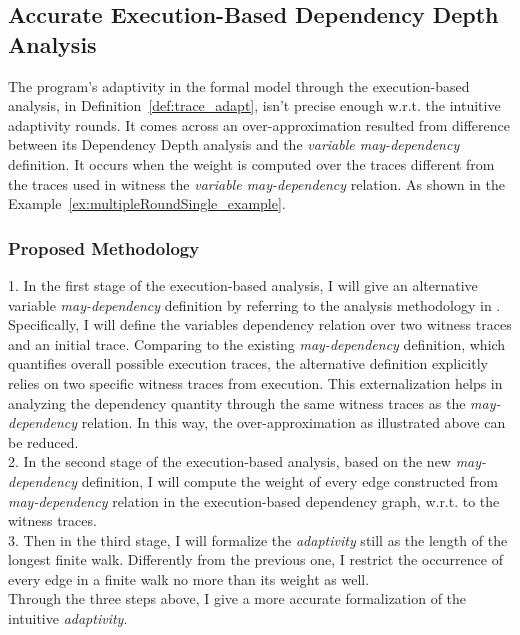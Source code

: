 \subsection{Accurate Execution-Based Dependency Depth Analysis}
\label{subsec:furthers-dep-depth}
%
The program's adaptivity in the formal model through the execution-based analysis,
in Definition~\ref{def:trace_adapt}, isn't precise enough w.r.t. the intuitive adaptivity rounds.
It comes across an over-approximation 
resulted from difference between its Dependency Depth analysis and the \emph{variable may-dependency} definition.
It occurs when the weight is computed over the traces different from the traces used in 
witness the \emph{variable may-dependency} relation.
As shown in the Example~\ref{ex:multipleRoundSingle_example}.

\subsubsection{Proposed Methodology}
\label{subsubsec:furthers-dep-depth}
% 
1. In the first stage of the execution-based analysis, 
I will give an alternative variable \emph{may-dependency} definition 
by referring to the analysis methodology in \cite{Cousot19a}.
\\
Specifically, I will define the variables dependency relation over two witness traces and an initial trace. Comparing to 
the existing \emph{may-dependency} definition, which quantifies overall possible execution traces, the alternative
definition explicitly relies on two specific witness traces from execution.
This externalization helps in analyzing the dependency quantity through the same 
witness traces as the \emph{may-dependency} relation. In this way, the over-approximation as illustrated above
can be reduced.
\\
2. In the second stage of the execution-based analysis, 
based on the new \emph{may-dependency} definition,
I will compute the weight of every edge constructed from 
\emph{may-dependency} relation in the execution-based dependency graph, w.r.t. to the witness traces.
\\
3. Then in the third stage, I will formalize the \emph{adaptivity} still as the 
length of the longest finite walk. Differently from the previous one, I restrict 
the occurrence of every edge in a finite walk no more than its weight as well.
\\
Through the three steps above, I give a more accurate formalization of the intuitive \emph{adaptivity}.
%
